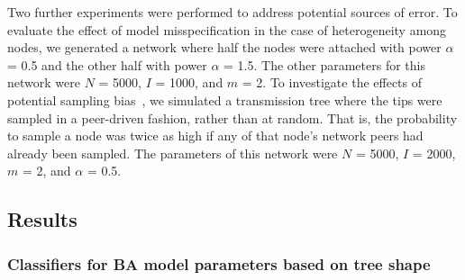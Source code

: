 %
%
%  

Two further experiments were performed to address potential sources of error.
To evaluate the effect of model misspecification in the case of heterogeneity
among nodes, we generated a network where half the nodes were attached with
power $\alpha$ = 0.5 and the other half with power $\alpha$ = 1.5. The other
parameters for this network were $N$ = 5000, $I$ = 1000, and $m$ = 2. To
investigate the effects of potential sampling
bias~\autocite{karcher2016quantifying}, we simulated a transmission tree where
the tips were sampled in a peer-driven fashion, rather than at random. That is,
the probability to sample a node was twice as high if any of that node's
network peers had already been sampled. The parameters of this network were $N$
= 5000, $I$ = 2000, $m$ = 2, and $\alpha$ = 0.5.

\subsection{Results}

\subsubsection*{Classifiers for BA model parameters based on tree shape}



















